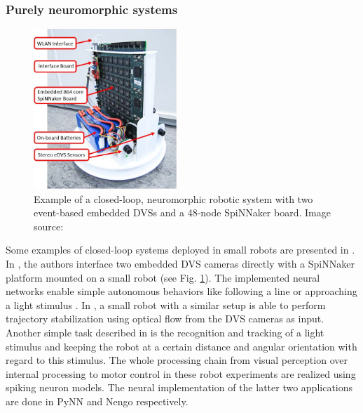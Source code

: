 \subsubsection{Purely neuromorphic systems}
\label{subsubsec:neuro_systems}

\begin{figure}[t!]
	\centering
	\includegraphics[width=0.48\textwidth]{imgs/SpinRobot.jpg}
	\caption{Example of a closed-loop, neuromorphic robotic system with two event-based embedded \acp{DVS} and a 48-node \ac{SpiNNaker} board. Image source: \cite{Galluppi2014}}
	\label{fig:spin_robot}
\end{figure}
Some examples of closed-loop systems deployed in small robots are presented in \cite{Davies2010, Denk2013, Galluppi2014}.
In \cite{Davies2010, Denk2013}, the authors interface two embedded \ac{DVS} cameras directly with a \ac{SpiNNaker} platform mounted on a small robot (see Fig. \ref{fig:spin_robot}).
The implemented neural networks enable simple autonomous behaviors like following a line \cite{Davies2010} or approaching a light stimulus \cite{Denk2013}.
In \cite{Galluppi2014}, a small robot with a similar setup is able to perform trajectory stabilization using optical flow from the \ac{DVS} cameras as input.
Another simple task described in \cite{Galluppi2014} is the recognition and tracking of a light stimulus and keeping the robot at a certain distance and angular orientation with regard to this stimulus.
The whole processing chain from visual perception over internal processing to motor control in these robot experiments are realized using spiking neuron models.
The neural implementation of the latter two applications are done in \ac{PyNN} and \ac{Nengo} respectively.

